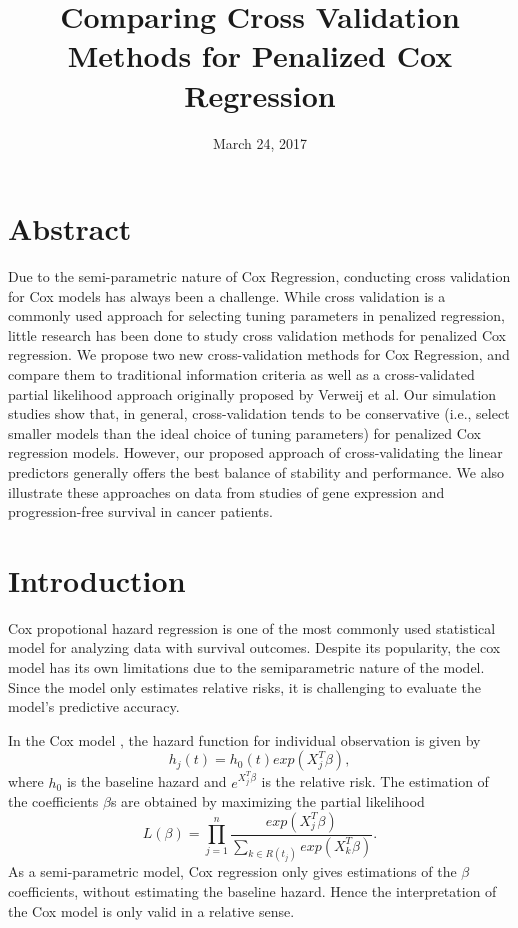 \documentclass{article}\usepackage[]{graphicx}\usepackage[]{color}
\title{Comparing Cross Validation Methods for Penalized Cox Regression}
\author{
}
\date{March 24, 2017}
\begin{document}
\maketitle

\section*{Abstract}
Due to the semi-parametric nature of Cox Regression, conducting cross validation for Cox models has always been a challenge. While cross validation is a commonly used approach for selecting tuning parameters in penalized regression, little research has been done to study cross validation methods for penalized Cox regression. We propose two new cross-validation methods for Cox Regression, and compare them to traditional information criteria as well as a cross-validated partial likelihood approach originally proposed by Verweij et al. Our simulation studies show that, in general, cross-validation tends to be conservative (i.e., select smaller models than the ideal choice of tuning parameters) for penalized Cox regression models. However, our proposed approach of cross-validating the linear predictors generally offers the best balance of stability and performance. We also illustrate these approaches on data from studies of gene expression and progression-free survival in cancer patients.

\section{Introduction}
Cox propotional hazard regression is one of the most commonly used statistical model for analyzing data with survival outcomes. Despite its popularity, the cox model has its own limitations due to the semiparametric nature of the model. Since the model only estimates relative risks, it is challenging to evaluate the model's predictive accuracy.

In the Cox model \citep{Cox1972}, the hazard function for individual observation is given by \begin{equation}h_{j}(t) = h_{0}(t) exp( X_{j}^{T} \beta),\end{equation} where $h_{0}$ is the baseline hazard and $e^{X_{j}^{T} \beta}$ is the relative risk. The estimation of the coefficients $\beta$s are obtained by maximizing the partial likelihood \begin{equation}L(\beta) = \prod_{j=1}^{n} \frac{exp ( X_{j}^{T} \beta)}{\sum_{ k \in R(t_{j})}exp ( X_{k}^{T} \beta)}.\end{equation} As a semi-parametric model, Cox regression only gives estimations of the $\beta$ coefficients, without estimating the baseline hazard. Hence the interpretation of the Cox model is only valid in a relative sense.
\end{document}
